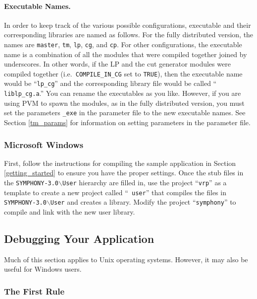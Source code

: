 \paragraph{Executable Names.}
\label{exe_names}
In order to keep track of the various possible configurations,
executable and their corresponding libraries are named as follows. For
the fully distributed version, the names are {\tt master}, {\tt tm},
{\tt lp}, {\tt cg}, and {\tt cp}. For other configurations, the
executable name is a combination of all the modules that were compiled
together joined by underscores. In other words, if the LP and the cut
generator modules were compiled together (i.e.~{\tt COMPILE\_IN\_CG}
set to {\tt TRUE}), then the executable name would be ``{\tt lp\_cg}''
and the corresponding library file would be called ``{\tt
liblp\_cg.a}.'' You can rename the executables as you like. However, if
you are using PVM to spawn the modules, as in the fully distributed
version, you must set the parameters {\tt *\_exe} in the parameter
file to the new executable names. See Section \ref{tm_params} for
information on setting parameters in the parameter file.

\subsubsection{Microsoft Windows}

First, follow the instructions for compiling the sample application in Section
\ref{getting_started} to ensure you have the proper settings. Once the stub 
files in the {\tt SYMPHONY-3.0$\backslash$User} hierarchy are filled in, use
the project ``{\tt vrp}'' as a template to create a new project called ``{\tt
user}'' that compiles the files in {\tt SYMPHONY-3.0$\backslash$User} and
creates a library. Modify the project ``{\tt symphony}'' to compile and link
with the new user library.

\subsection{Debugging Your Application}

Much of this section applies to Unix operating systems. However, it may
also be useful for Windows users.

\subsubsection{The First Rule}

